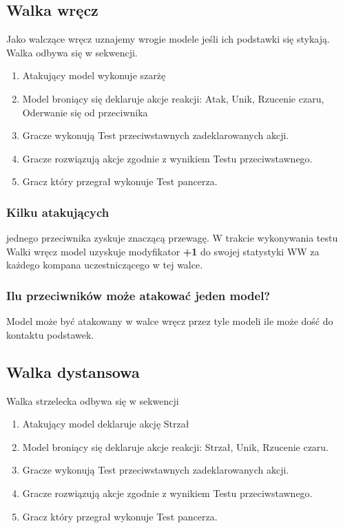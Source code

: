 \subsection{Walka wręcz}
Jako walczące wręcz uznajemy wrogie modele jeśli ich podstawki się stykają. Walka odbywa się w sekwencji.
\begin{enumerate}
    \item Atakujący model wykonuje szarżę
    \item Model broniący się deklaruje akcje reakcji: Atak, Unik, Rzucenie czaru, Oderwanie się od przeciwnika
    \item Gracze wykonują Test przeciwstawnych zadeklarowanych akcji.
    \item Gracze rozwiązują akcje zgodnie z wynikiem Testu przeciwstawnego.
    \item Gracz który przegrał wykonuje Test pancerza.
\end{enumerate}

\subsubsection{Kilku atakujących} jednego przeciwnika zyskuje znaczącą przewagę. W trakcie wykonywania testu Walki wręcz model uzyskuje modyfikator \textbf{+1} do swojej statystyki WW za każdego kompana uczestniczącego w tej walce. 

\subsubsection{Ilu przeciwników może atakować jeden model?} Model może być atakowany w walce wręcz przez tyle modeli ile może dość do kontaktu podstawek. 

\subsection{Walka dystansowa}
Walka strzelecka odbywa się w sekwencji
\begin{enumerate}
    \item Atakujący model deklaruje akcję Strzał
    \item Model broniący się deklaruje akcje reakcji: Strzał, Unik, Rzucenie czaru. 
    \item Gracze wykonują Test przeciwstawnych zadeklarowanych akcji.
    \item Gracze rozwiązują akcje zgodnie z wynikiem Testu przeciwstawnego. 
    \item Gracz który przegrał wykonuje Test pancerza.
\end{enumerate}

